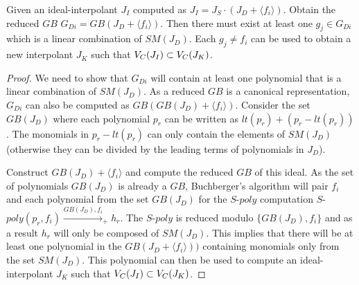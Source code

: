 \begin{Theorem}
\label{thm:chainofinter}
Given an ideal-interpolant $J_I$ computed as $J_I = J_S\cdot(J_D + \langle f_i \rangle)$. Obtain the
reduced $GB$ $G_{Di}=GB(J_D + \langle f_i \rangle)$. Then there must exist 
at least one $g_j \in
G_{Di}$ which is a linear combination of $SM(J_D)$. 
Each $g_j \neq f_i$ can be used to 
obtain a new interpolant $J_K$ such that
${V_C}(J_I) \subset {V_C}(J_K)$.  
\end{Theorem}

\begin{proof} 
We need to show that $G_{Di}$ will contain 
at least one polynomial that is a  linear combination of $SM(J_D)$.
As a reduced $GB$ is a canonical representation, $G_{Di}$ 
can also be computed as $GB(GB(J_D) + \langle f_i \rangle)$. 
Consider the set $GB(J_D)$
where each polynomial $p_r$ can be written as $lt(p_r) + (p_r - lt(p_r))$. 
The monomials in $p_r-lt(p_r)$ can only contain the elements of $SM(J_D)$ 
(otherwise they can be divided by the leading terms of polynomials in $J_D$).

\par Construct $GB(J_D) + \langle f_i \rangle$ and compute the 
reduced $GB$ of this ideal. As the set of polynomials $GB(J_D)$ is already a 
$GB$, Buchberger's algorithm will pair $f_i$ and each polynomial from the set
$GB(J_D)$ for the $S$-$poly$ computation $S$-$poly(p_r,f_i) \xrightarrow{GB(J_D),f_i}_+ h_r$. 
The $S$-$poly$ is reduced modulo $\{GB(J_D), f_i\}$ 
and as a result $h_r$ will only be composed of $SM(J_D)$. 
This implies that there will be at least one polynomial
in the $GB(J_D + \langle f_i \rangle))$ containing monomials only from the set $SM(J_D)$. 
This polynomial can then be used to compute an ideal-interpolant $J_K$ such that 
${V_C}(J_I) \subset {V_C}(J_K)$.


\end{proof}

